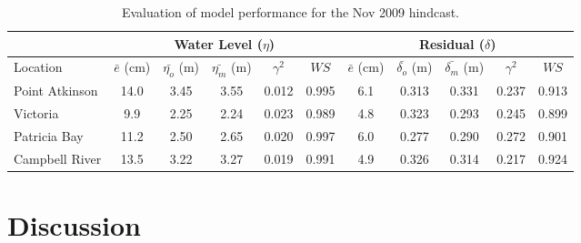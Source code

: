 \documentclass[pdftex,10pt]{article}
\begin{document}
\begin{table}[h]
\centering 
\begin{tabular}{|l |c c c c c | c c c c c|} 
\hline 
& \multicolumn{5}{|c|}{Water Level ($\eta$)}        & \multicolumn{5}{|c|}{Residual ($\delta$)} \\ 
\hline 
Location       & $\bar{e}$ (cm) & $\bar{\eta_{o}}$ (m) & $\bar{\eta_{m}}$ (m) & $\gamma^2$ & $WS$   & $\bar{e}$ (cm) & $\bar{\delta_{o}}$ (m) & $\bar{\delta_{m}}$ (m) & $\gamma^2$ & $WS$ \\
\hline 
Point Atkinson & 14.0           &  3.45                & 3.55                 &   0.012    & 0.995  &  6.1           &  0.313                 & 0.331                  &  0.237     & 0.913 \\
Victoria       &  9.9           &  2.25                & 2.24                 &   0.023    & 0.989  &  4.8           &  0.323                 & 0.293                  &  0.245     & 0.899 \\
Patricia Bay   & 11.2           &  2.50                & 2.65                 &   0.020    & 0.997  &  6.0           &  0.277                 & 0.290                  &  0.272     & 0.901 \\
Campbell River & 13.5           &  3.22                & 3.27                 &   0.019    & 0.991  &  4.9           &  0.326                 & 0.314                  &  0.217     & 0.924 \\
\hline 
\end{tabular}
\caption{Evaluation of model performance for the Nov 2009 hindcast.}
\label{tab:nov2009stat} 
\end{table}




\section{Discussion}\label{sec:diss}
\end{document}
